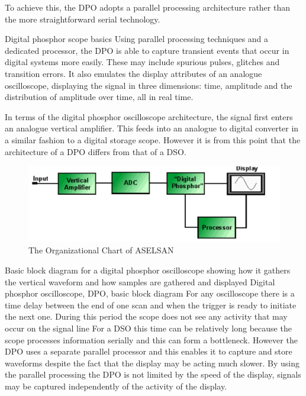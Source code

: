 To achieve this, the DPO adopts a parallel processing architecture rather than the more straightforward serial technology.


Digital phosphor scope basics
Using parallel processing techniques and a dedicated processor, the DPO is able to capture transient events that occur in digital systems more easily. These may include spurious pulses, glitches and transition errors. It also emulates the display attributes of an analogue oscilloscope, displaying the signal in three dimensions: time, amplitude and the distribution of amplitude over time, all in real time.

In terms of the digital phosphor oscilloscope architecture, the signal first enters an analogue vertical amplifier. This feeds into an analogue to digital converter in a similar fashion to a digital storage scope. However it is from this point that the architecture of a DPO differs from that of a DSO.

\begin{figure}[H]
	\center
	\setlength{\unitlength}{\textwidth} 
	\includegraphics[width=1.0\unitlength]{dpo}
	\caption{\label{fig:dpo}The Organizational Chart of ASELSAN }
\end{figure}

Basic block diagram for a digital phosphor oscilloscope showing how it gathers the vertical waveform and how samples are gathered and displayed
Digital phosphor oscilloscope, DPO, basic block diagram
For any oscilloscope there is a time delay between the end of one scan and when the trigger is ready to initiate the next one. During this period the scope does not see any activity that may occur on the signal line For a DSO this time can be relatively long because the scope processes information serially and this can form a bottleneck. However the DPO uses a separate parallel processor and this enables it to capture and store waveforms despite the fact that the display may be acting much slower. By using the parallel processing the DPO is not limited by the speed of the display, signals may be captured independently of the activity of the display.

